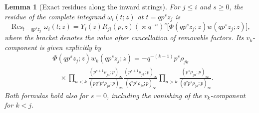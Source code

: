 \documentclass[12pt]{amsart}
\newtheorem{lem}[thm]{Lemma}
\theoremstyle{definition}
\numberwithin{equation}{section}
\theoremstyle{definition}
\let\om\omega
\let\ge\geqslant
\let\le\leqslant
\let\on\operatorname
\def\Res{\on{Res}}
\def\beq{\begin{equation}}
\def\eeq{\end{equation}}
\begin{document}
\begin{lem}[Exact residues along the inward strings]
\label{lem:hyp-exact-residues}
For $j\le i$ and $s\ge0$, the residue of the complete
integrand $\om_i(t;z)$ at $t=qp^sz_j$ is
\beq\label{eq:hyp-limit-full-residue}
 \Res_{t=qp^sz_j}\om_i(t;z)
 =Y_i(z)R_{ji}(p,z)(\varkappa q^{-n})^s
    \bigl[\Phi(qp^sz_j;z)w(qp^sz_j;z)\bigr],
\eeq
where the bracket denotes the value after cancellation
of removable factors.  Its $v_k$-component is given
explicitly by
\beq\label{eq:hyp-limit-phase-weight-string}
 \begin{aligned}
 &\Phi(qp^sz_j;z)w_k(qp^sz_j;z)
 =-q^{-(k-1)}p^s\rho_{jk}\\[-2pt]
 &\quad\times
 \prod_{a<k}
 \frac{(p^{s+1}\rho_{ja};p)_\infty}
      {(pq^2p^s\rho_{ja};p)_\infty}
 \frac{(p^{s+1}\rho_{jk};p)_\infty}
      {(q^2p^s\rho_{jk};p)_\infty}
 \prod_{a>k}
 \frac{(p^s\rho_{ja};p)_\infty}
      {(q^2p^s\rho_{ja};p)_\infty}.
 \end{aligned}
\eeq
Both formulas hold also for $s=0$, including the vanishing
of the $v_k$-component for $k<j$.
\end{lem}
\end{document}
